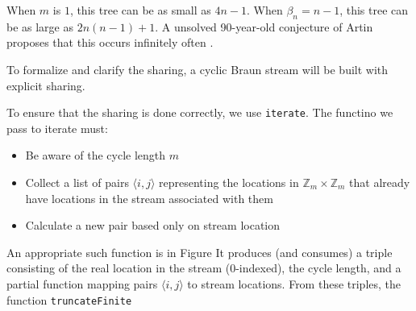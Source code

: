 \documentclass{llncs}
\begin{document}
When $m$ is $1$, this tree can be as small as $4n-1$.
When $\beta_n = n-1$, this tree can be as large as $2n(n-1)+1$.
A unsolved 90-year-old conjecture of Artin proposes that this occurs infinitely often \cite{artin}.


To formalize and clarify the sharing, a cyclic Braun stream will be built with explicit sharing.

To ensure that the sharing is done correctly, we use {\tt iterate}.
The functino we pass to iterate must:
\begin{itemize}
\item Be aware of the cycle length $m$
\item Collect a list of pairs $\langle i,j \rangle$ representing the locations in $\mathbb{Z}_m \times \mathbb{Z}_m$ that already have locations in the stream associated with them
\item Calculate a new pair based only on stream location
\end{itemize}

An appropriate such function is in Figure 
It produces (and consumes) a triple consisting of the real location in the stream (0-indexed), the cycle length, and a partial function mapping pairs $\langle i,j \rangle$ to stream locations.
From these triples, the function {\tt truncateFinite} 
\end{document}

